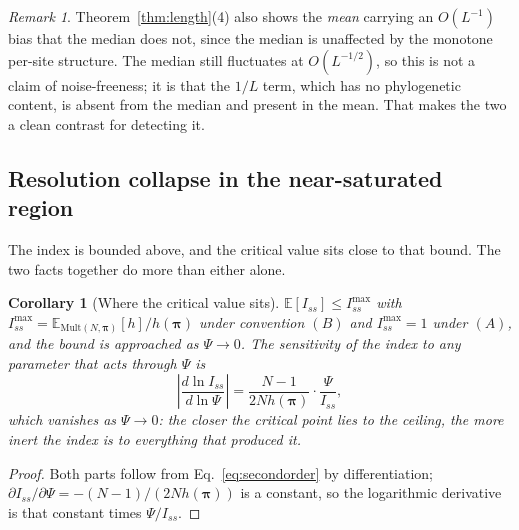 \documentclass[11pt]{article}
\newcommand{\Iss}{I_{ss}}
\newcommand{\bpi}{\boldsymbol{\pi}}
\newcommand{\E}{\mathbb{E}}
\newcommand{\Mult}{\mathrm{Mult}}
\newtheorem{corollary}[theorem]{Corollary}
\theoremstyle{definition}
\theoremstyle{remark}
\newtheorem{remark}[theorem]{Remark}
\begin{document}
\begin{remark}
Theorem~\ref{thm:length}(4) also shows the \emph{mean} carrying an $O(L^{-1})$
bias that the median does not, since the median is unaffected by the monotone
per-site structure. The median still fluctuates at $O(L^{-1/2})$, so this is
not a claim of noise-freeness; it is that the $1/L$ term, which has no
phylogenetic content, is absent from the median and present in the mean. That
makes the two a clean contrast for detecting it.
\end{remark}

\subsection{Resolution collapse in the near-saturated region}
\label{sec:collapse}

The index is bounded above, and the critical value sits close to that bound.
The two facts together do more than either alone.

\begin{corollary}[Where the critical value sits]
\label{cor:ceilinggap}
$\E[\Iss]\le\Iss^{\max}$ with
$\Iss^{\max}=\E_{\Mult(N,\bpi)}[h]/h(\bpi)$ under convention $(B)$ and
$\Iss^{\max}=1$ under $(A)$, and the bound is approached as $\Psi\to0$. The
sensitivity of the index to any parameter that acts through $\Psi$ is
\begin{equation}
  \left|\frac{d\ln\Iss}{d\ln\Psi}\right|=\frac{N-1}{2Nh(\bpi)}\cdot\frac{\Psi}{\Iss},
  \label{eq:sensitivity}
\end{equation}
which vanishes as $\Psi\to0$: the closer the critical point lies to the
ceiling, the more inert the index is to everything that produced it.
\end{corollary}

\begin{proof}
Both parts follow from Eq.~\eqref{eq:secondorder} by differentiation;
$\partial\Iss/\partial\Psi=-(N-1)/(2Nh(\bpi))$ is a constant, so the
logarithmic derivative is that constant times $\Psi/\Iss$.
\end{proof}
\end{document}
